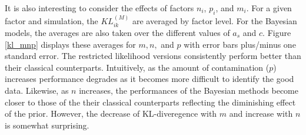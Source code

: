 \documentclass[ba]{imsart}
\begin{document}
It is also interesting to consider the effects of factors $n_{i}$, $p_{i}$, and $m_{i}$. For a given factor and simulation, the $KL^{(M)}_{ik}$  are averaged by factor level. For the Bayesian models, the averages are also taken over the different values of $a_{s}$ and $c$. Figure \ref{kl_mnp} displays these averages for $m,n,$ and $p$ with error bars plus/minus one standard error. The restricted likelihood versions consistently perform better than their classical counterparts. Intuitively, as the amount of contamination ($p$) increases performance degrades as it becomes more difficult to identify the good data. Likewise, as $n$ increases, the performances of the Bayesian methods become closer to those of the their classical counterparts reflecting the diminishing effect of the prior. However, the decrease of KL-diveregence with $m$ and increase with $n$ is somewhat surprising. %
 
\end{document}
